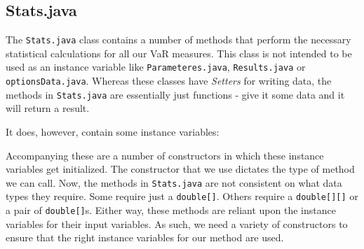 \documentclass[../Dissertation.tex]{subfiles}
\begin{document}
\subsection{Stats.java}
\label{section:stats}
The \lstinline|Stats.java| class contains a number of methods that perform the necessary statistical calculations for all our VaR measures.
This class is not intended to be used as an instance variable like \lstinline|Parameteres.java|, \lstinline|Results.java| or \lstinline|optionsData.java|.
Whereas these classes have \textit{Setters} for writing data, the methods in \lstinline|Stats.java| are essentially just functions - give it some data and it will return a result.

It does, however, contain some instance variables:

Accompanying these are a number of constructors in which these instance variables get initialized.
The constructor that we use dictates the type of method we can call.
Now, the methods in \lstinline|Stats.java| are not consistent on what data types they require.
Some require just a \lstinline|double[]|.
Others require a \lstinline|double[][]| or a pair of \lstinline|double[]|s.
Either way, these methods are reliant upon the instance variables for their input variables.
As such, we need a variety of constructors to ensure that the right instance variables for our method are used.


\end{document}
